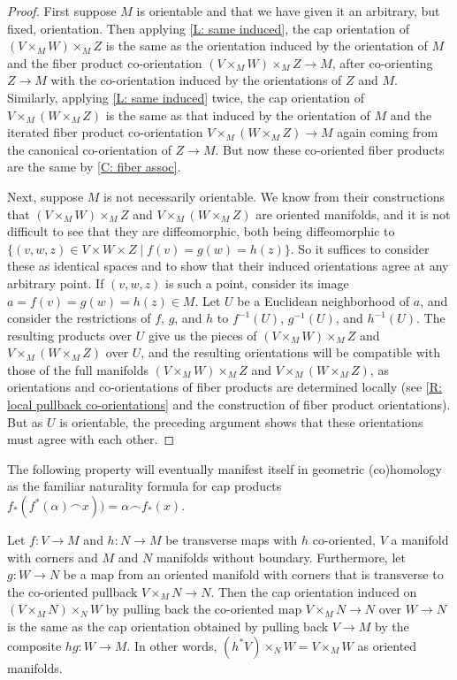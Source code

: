 \begin{proof}
	First suppose $M$ is orientable and that we have given it an arbitrary, but fixed, orientation.
	Then applying \cref{L: same induced}, the cap orientation of $(V \times_M W) \times_M Z$ is the same as the orientation induced by the orientation of $M$ and the fiber product co-orientation $(V \times_M W) \times_M Z \to M$, after co-orienting $Z \to M$ with the co-orientation induced by the orientations of $Z$ and $M$.
	Similarly, applying \cref{L: same induced} twice, the cap orientation of $V \times_M (W \times_M Z)$ is the same as that induced by the orientation of $M$ and the iterated fiber product co-orientation $V \times_M (W \times_M Z) \to M$ again coming from the canonical co-orientation of $Z \to M$.
	But now these co-oriented fiber products are the same by \cref{C: fiber assoc}.

	Next, suppose $M$ is not necessarily orientable.
	We know from their constructions that $(V \times_M W) \times_M Z$ and $V \times_M (W \times_M Z)$ are oriented manifolds, and it is not difficult to see that they are diffeomorphic, both being diffeomorphic to $\{(v,w,z) \in V \times W \times Z \mid f(v) = g(w) = h(z)\}$.
	So it suffices to consider these as identical spaces and to show that their induced orientations agree at any arbitrary point.
	If $(v,w,z)$ is such a point, consider its image $a = f(v) = g(w) = h(z) \in M$.
	Let $U$ be a Euclidean neighborhood of $a$, and consider the restrictions of $f$, $g$, and $h$ to $f^{-1}(U)$, $g^{-1}(U)$, and $h^{-1}(U)$.
	The resulting products over $U$ give us the pieces of $(V \times_M W) \times_M Z$ and $V \times_M (W \times_M Z)$ over $U$, and the resulting orientations will be compatible with those of the full manifolds $(V \times_M W) \times_M Z$ and $V \times_M (W \times_M Z)$, as orientations and co-orientations of fiber products are determined locally (see \cref{R: local pullback co-orientations} and the construction of fiber product orientations).
	But as $U$ is orientable, the preceding argument shows that these orientations must agree with each other.
\end{proof}

The following property will eventually manifest itself in geometric (co)homology as the familiar naturality formula for cap products $f_*(f^*(\alpha)\frown x)) = \alpha\frown f_*(x)$.

\begin{proposition}\label{P: natural cap}
	Let $f \colon V \to M$ and $h \colon N \to M$ be transverse maps with $h$ co-oriented, $V$ a manifold with corners and $M$ and $N$ manifolds without boundary.
	Furthermore, let $g \colon W \to N$ be a map from an oriented manifold with corners that is transverse to the co-oriented pullback $V \times_M N \to N$.
	Then the cap orientation induced on $(V \times_M N) \times_N W$ by pulling back the co-oriented map $V \times_M N \to N$ over $W \to N$
	is the same as the cap orientation obtained by pulling back $V \to M$ by the composite $hg \colon W \to M$.
	In other words, $(h^*V) \times_N W = V \times_M W$ as oriented manifolds.
\end{proposition}

